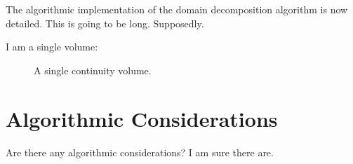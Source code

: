 The algorithmic implementation of the domain decomposition algorithm is now detailed.
This is going to be long.
Supposedly.

I am a single volume:

\begin{figure}[ht]
\centering

\caption{A single continuity volume.}
\label{fig:single3dvol}
\end{figure}


\section{Algorithmic Considerations}
\label{sect:dd_algo_con}

Are there any algorithmic considerations?
I am sure there are.
